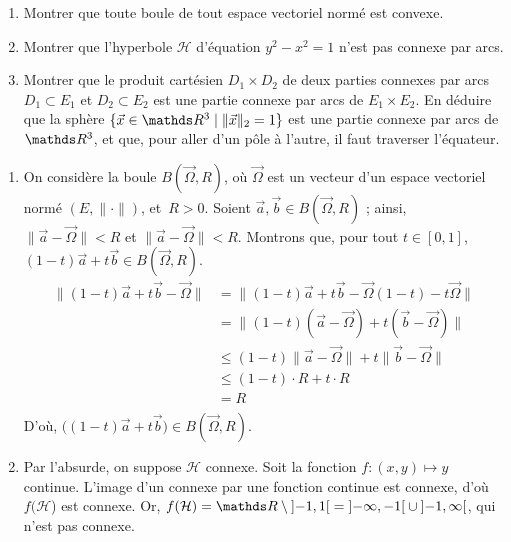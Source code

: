 \begin{exo}
	\begin{slshape}
		\begin{enumerate}
			\item Montrer que toute boule de tout espace vectoriel normé est convexe.
			\item Montrer que l'hyperbole $\mathcal{H}$ d'équation $y^2 - x^2 = 1$ n'est pas connexe par arcs.
			\item Montrer que le produit cartésien $D_1 \times D_2$ de deux parties connexes par arcs $D_1 \subset E_1$ et $D_2 \subset E_2$ est une partie connexe par arcs de $E_1 \times E_2$. En déduire que la sphère $\{\vec{x} \in \R^3  \mid \|\vec{x}\|_2 = 1\}$ est une partie connexe par arcs de $\R^3$, et que, pour aller d'un pôle à l'autre, il faut traverser l'équateur.
		\end{enumerate}
	\end{slshape}

	\begin{enumerate}
		\item On considère la boule $B(\vec{\Omega}, R)$, où $\vec{\Omega}$ est un vecteur d'un espace vectoriel normé $(E, \|\cdot\|)$, et~$R > 0$.
			Soient $\vec{a}, \vec{b} \in B(\vec{\Omega}, R)$ ; ainsi, $\|\vec{a} - \vec{\Omega}\| < R$ et $\|\vec{a} - \vec{\Omega}\| < R$.
			Montrons que, pour tout $t \in [0,1]$, $(1-t)\vec{a} + t \vec{b} \in B(\vec{\Omega}, R)$.
			\begin{align*}
				\|(1-t) \vec{a} + t \vec{b} - \vec{\Omega}\| &= \|(1-t) \vec{a} + t \vec{b} - \vec{\Omega} (1-t) - t \vec{\Omega}\|\\
				&= \|(1-t)(\vec{a} - \vec{\Omega}) + t (\vec{b} - \vec{\Omega})\| \\
				&\le (1-t) \|\vec{a} - \vec{\Omega}\| + t \|\vec{b} - \vec{\Omega}\|\\
				&\le (1-t) \cdot R + t \cdot R\\
				&= R \\
			\end{align*}
			D'où, $\big((1-t) \vec{a} + t \vec{b}\big) \in B(\vec{\Omega}, R)$.
		\item Par l'absurde, on suppose $\mathcal{H}$ connexe.
			Soit la fonction $f : (x,y) \mapsto y$ continue.
			L'image d'un connexe par une fonction continue est connexe, d'où $f(\mathcal{H}$) est connexe.
			Or, $f(\mathcal{H}) = \R \setminus {]{-1},1[} = {]{-\infty},-1[} \cup {]{-1}, \infty[}$, qui n'est pas connexe.
	\end{enumerate}
\end{exo}

